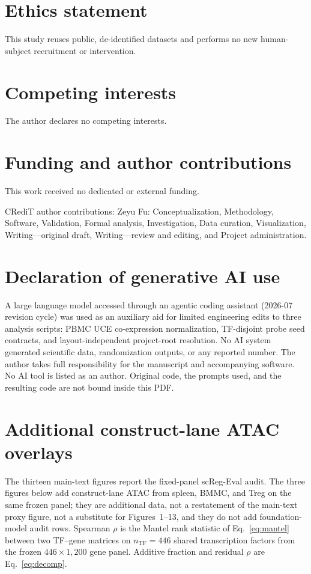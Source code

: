 \documentclass[fleqn,10pt,lineno]{wlpeerj}
\begin{document}
\section*{Ethics statement}
This study reuses public, de-identified datasets and performs no new human-subject recruitment or
intervention.

\section*{Competing interests}
The author declares no competing interests.

\section*{Funding and author contributions}
This work received no dedicated or external funding.

CRediT author contributions: Zeyu Fu: Conceptualization, Methodology, Software, Validation,
Formal analysis, Investigation, Data curation, Visualization, Writing---original draft, Writing---review
and editing, and Project administration.

\section*{Declaration of generative AI use}
A large language model accessed through an agentic coding assistant (2026-07
revision cycle) was used as an auxiliary aid for limited engineering edits to
three analysis scripts: PBMC UCE co-expression normalization, TF-disjoint probe
seed contracts, and layout-independent project-root resolution. No AI system
generated scientific data, randomization outputs, or any reported number. The
author takes full responsibility for the manuscript and accompanying software.
No AI tool is listed as an author. Original code, the prompts used, and the
resulting code are not bound inside this PDF.

\FloatBarrier
\appendix
\setcounter{figure}{0}
\renewcommand{\thefigure}{A\arabic{figure}}
\section{Additional construct-lane ATAC overlays}

The thirteen main-text figures report the fixed-panel scReg-Eval audit. The three figures below add
construct-lane ATAC from spleen, BMMC, and Treg on the same frozen panel; they are additional data,
not a restatement of the main-text proxy figure, not a substitute for Figures~1--13, and they do not
add foundation-model audit rows. Spearman $\rho$ is the Mantel rank statistic of Eq.~\eqref{eq:mantel} between two TF--gene
matrices on $n_{\mathrm{TF}}=446$ shared transcription factors from the frozen $446\times 1{,}200$
gene panel. Additive fraction and residual $\rho$ are Eq.~\eqref{eq:decomp}.
\end{document}
